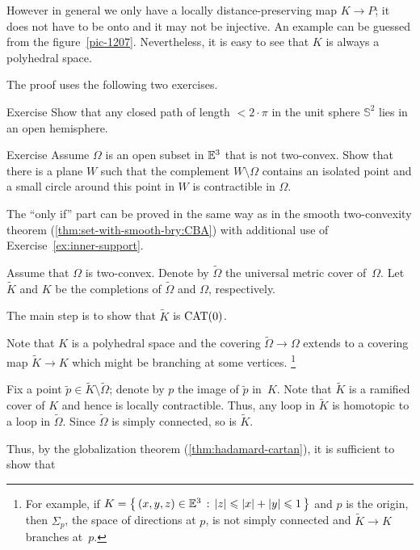 However in general
we only have a locally distance-preserving map $K\to P$;
it does not have to be onto and it may not be injective. 
An example can be guessed from the figure~\ref{pic-1207}.
Nevertheless, it is easy to see that $K$ is always a polyhedral space.

The proof uses the following two exercises.

\begin{thm}[!]{Exercise}\label{ex:hemisphere}
Show that any closed path of length $<2\cdot \pi$ in the unit sphere $\mathbb{S}^2$ lies in an open hemisphere.
\end{thm}

\begin{thm}[!]{Exercise}\label{ex:inner-support}
Assume $\Omega$ is an open subset in $\mathbb{E}^3$
that is not two-convex.
Show that there is a plane $W$ such that the complement 
$W\setminus \Omega$ contains an isolated point and a small circle around this point in $W$ is contractible in $\Omega$.
\end{thm}

The ``only if'' part can be proved in the same way as in the smooth two-convexity theorem (\ref{thm:set-with-smooth-bry:CBA}) with additional use of Exercise~\ref{ex:inner-support}.

Assume that $\Omega$ is two-convex.
Denote by $\tilde\Omega$ the universal metric cover of~$\Omega$.
Let $\tilde K$ and $K$ be the completions of $\tilde\Omega$ and $\Omega$, respectively.

The main step is to show that $\tilde K$ is $\mathrm{CAT}(0)$. 

Note that $K$ is a polyhedral space and the covering $\tilde\Omega\to\Omega$ extends to a covering map $\tilde K\to K$ which might be branching at some vertices.%
\footnote{For example, if $K=\left\{\,{(x,y,z)\in\mathbb{E}^3}\,:\,{|z|\leqslant |x|+|y|\leqslant 1}\,\right\}$ and $p$ is the origin, then $\Sigma_p$,
the space of directions at $p$,
is not simply connected and $\tilde K\to K$ branches at~$p$.}

Fix a point $\tilde p\in \tilde K\setminus\tilde\Omega$; 
denote by $p$ the image of $\tilde p$ in~$K$.
Note that $\tilde K$ is a ramified cover of $K$ and hence is locally contractible.
Thus, any loop in $\tilde K$ is homotopic to a loop in $\tilde\Omega$.
Since $\tilde\Omega$ is simply connected, so is $\tilde K$.

Thus, by the globalization theorem (\ref{thm:hadamard-cartan}), it is sufficient to show that

